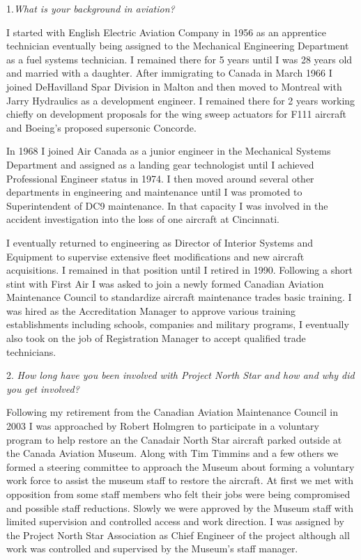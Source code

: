 \begin{multicols}{2}

1.\textit{What is your background in aviation?}

I started with English Electric Aviation Company in 1956 as an
apprentice technician eventually being assigned to the Mechanical
Engineering Department as a fuel systems technician. I remained there
for 5 years until I was 28 years old and married with a daughter. After
immigrating to Canada in March 1966 I joined DeHavilland Spar Division
in Malton and then moved to Montreal with Jarry Hydraulics as a
development engineer. I remained there for 2 years working chiefly on
development proposals for the wing sweep actuators for F111 aircraft
and Boeing's proposed supersonic Concorde.

In 1968 I joined Air Canada as a junior engineer in the Mechanical
Systems Department and assigned as a landing gear technologist until I
achieved Professional Engineer status in 1974. I then moved around
several other departments in engineering and maintenance until I was
promoted to Superintendent of DC9 maintenance. In that capacity I was
involved in the accident investigation into the loss of one aircraft at
Cincinnati.

I eventually returned to engineering as Director of Interior Systems and
Equipment to supervise extensive fleet modifications and new aircraft
acquisitions. I remained in that position until I retired in 1990.
Following a short stint with First Air I was asked to join a newly formed
Canadian Aviation Maintenance Council to standardize aircraft
maintenance trades basic training. I was hired as the Accreditation
Manager to approve various training establishments including schools,
companies and military programs, I eventually also took on the job of
Registration Manager to accept qualified trade technicians.

2. \textit{How long have you been involved with Project North Star and how and why did you get involved?}

Following my retirement from the Canadian Aviation Maintenance
Council in 2003 I was approached by Robert Holmgren to participate in
a voluntary program to help restore an the Canadair North Star aircraft
parked outside at the Canada Aviation Museum. Along with Tim
Timmins and a few others we formed a steering committee to approach
the Museum about forming a voluntary work force to assist the museum
staff to restore the aircraft. At first we met with opposition from some
staff members who felt their jobs were being compromised and possible
staff reductions. Slowly we were approved by the Museum staff with
limited supervision and controlled access and work direction. I was
assigned by the Project North Star Association as Chief Engineer of the
project although all work was controlled and supervised by the
Museum's staff manager.


\end{multicols}
